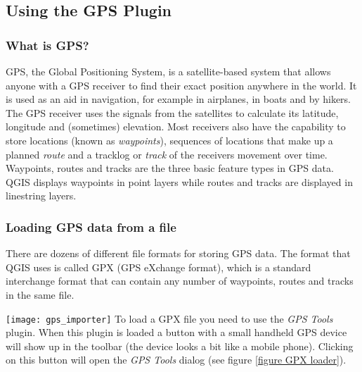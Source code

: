 \subsection{Using the GPS Plugin}\label{label_plugingps}

\subsubsection{What is GPS?}\label{whatsgps}

GPS, the Global Positioning System, is a satellite-based system that
allows anyone with a GPS receiver to find their exact position anywhere
in the world. It is used as an aid in navigation, for example in airplanes,
in boats and by hikers. The GPS receiver uses the signals from the
satellites to calculate its latitude, longitude and (sometimes) elevation.
Most receivers also have the capability to store locations (known
as \emph{waypoints}), sequences of locations that make up a planned
\emph{route} and a tracklog or \emph{track} of the receivers movement
over time. Waypoints, routes and tracks are the three basic feature
types in GPS data. QGIS displays waypoints in point layers while routes
and tracks are displayed in linestring layers.

\subsubsection{Loading GPS data from a file}\label{label_loadgps}

There are dozens of different file formats for storing GPS data. The
format that QGIS uses is called GPX (GPS eXchange format), which is
a standard interchange format that can contain any number of waypoints,
routes and tracks in the same file.

\texttt{[image: gps\_importer]} To load a GPX file you need to use the
\emph{GPS
Tools} plugin. When this plugin is loaded a button with a small handheld GPS
device will show up in the toolbar (the device looks a bit like a mobile
phone). Clicking on this button will open the \emph{GPS Tools} dialog (see
figure \ref{figure GPX loader}).


